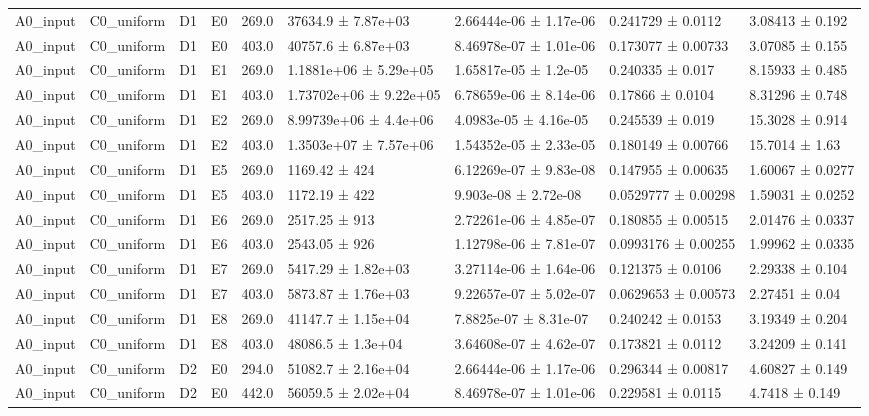 \begin{table}
\begin{tabular}{lllllllll}
A0\_input & C0\_uniform & D1 & E0 & 269.0 & 37634.9 ± 7.87e+03 & 2.66444e-06 ± 1.17e-06 & 0.241729 ± 0.0112 & 3.08413 ± 0.192 \\
A0\_input & C0\_uniform & D1 & E0 & 403.0 & 40757.6 ± 6.87e+03 & 8.46978e-07 ± 1.01e-06 & 0.173077 ± 0.00733 & 3.07085 ± 0.155 \\
A0\_input & C0\_uniform & D1 & E1 & 269.0 & 1.1881e+06 ± 5.29e+05 & 1.65817e-05 ± 1.2e-05 & 0.240335 ± 0.017 & 8.15933 ± 0.485 \\
A0\_input & C0\_uniform & D1 & E1 & 403.0 & 1.73702e+06 ± 9.22e+05 & 6.78659e-06 ± 8.14e-06 & 0.17866 ± 0.0104 & 8.31296 ± 0.748 \\
A0\_input & C0\_uniform & D1 & E2 & 269.0 & 8.99739e+06 ± 4.4e+06 & 4.0983e-05 ± 4.16e-05 & 0.245539 ± 0.019 & 15.3028 ± 0.914 \\
A0\_input & C0\_uniform & D1 & E2 & 403.0 & 1.3503e+07 ± 7.57e+06 & 1.54352e-05 ± 2.33e-05 & 0.180149 ± 0.00766 & 15.7014 ± 1.63 \\
A0\_input & C0\_uniform & D1 & E5 & 269.0 & 1169.42 ± 424 & 6.12269e-07 ± 9.83e-08 & 0.147955 ± 0.00635 & 1.60067 ± 0.0277 \\
A0\_input & C0\_uniform & D1 & E5 & 403.0 & 1172.19 ± 422 & 9.903e-08 ± 2.72e-08 & 0.0529777 ± 0.00298 & 1.59031 ± 0.0252 \\
A0\_input & C0\_uniform & D1 & E6 & 269.0 & 2517.25 ± 913 & 2.72261e-06 ± 4.85e-07 & 0.180855 ± 0.00515 & 2.01476 ± 0.0337 \\
A0\_input & C0\_uniform & D1 & E6 & 403.0 & 2543.05 ± 926 & 1.12798e-06 ± 7.81e-07 & 0.0993176 ± 0.00255 & 1.99962 ± 0.0335 \\
A0\_input & C0\_uniform & D1 & E7 & 269.0 & 5417.29 ± 1.82e+03 & 3.27114e-06 ± 1.64e-06 & 0.121375 ± 0.0106 & 2.29338 ± 0.104 \\
A0\_input & C0\_uniform & D1 & E7 & 403.0 & 5873.87 ± 1.76e+03 & 9.22657e-07 ± 5.02e-07 & 0.0629653 ± 0.00573 & 2.27451 ± 0.04 \\
A0\_input & C0\_uniform & D1 & E8 & 269.0 & 41147.7 ± 1.15e+04 & 7.8825e-07 ± 8.31e-07 & 0.240242 ± 0.0153 & 3.19349 ± 0.204 \\
A0\_input & C0\_uniform & D1 & E8 & 403.0 & 48086.5 ± 1.3e+04 & 3.64608e-07 ± 4.62e-07 & 0.173821 ± 0.0112 & 3.24209 ± 0.141 \\
A0\_input & C0\_uniform & D2 & E0 & 294.0 & 51082.7 ± 2.16e+04 & 2.66444e-06 ± 1.17e-06 & 0.296344 ± 0.00817 & 4.60827 ± 0.149 \\
A0\_input & C0\_uniform & D2 & E0 & 442.0 & 56059.5 ± 2.02e+04 & 8.46978e-07 ± 1.01e-06 & 0.229581 ± 0.0115 & 4.7418 ± 0.149 \\

\end{tabular}
\end{table}
